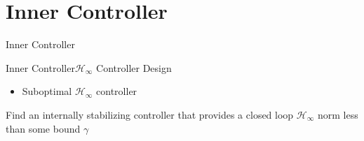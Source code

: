 \section{Inner Controller}

\begin{frame}{Inner Controller}{}
\end{frame}

\begin{frame}{Inner Controller}{$\mathcal{H}_\infty$ Controller Design}
    \begin{itemize}
        \item Suboptimal $\mathcal{H}_\infty$ controller
    \end{itemize}
    \vspace{0.2cm}
    \begin{center}
        Find an internally stabilizing controller that provides a closed loop $\mathcal{H}_\infty$ norm less than some bound $\gamma$
    \end{center}
\end{frame}

